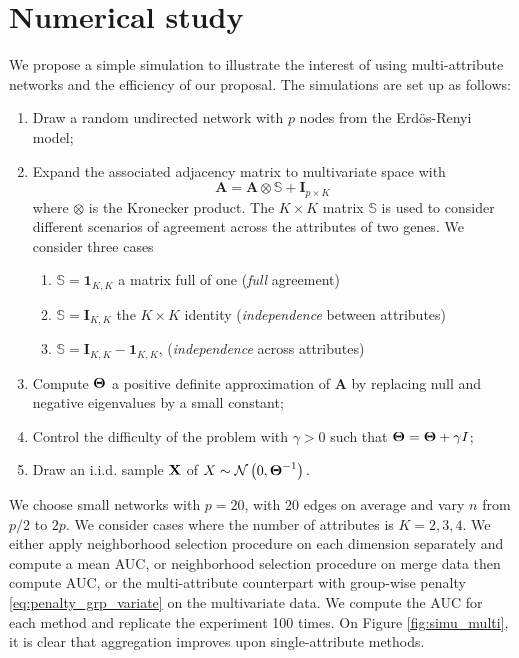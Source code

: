 \section{Numerical  study}

We propose a simple simulation to illustrate the interest of using
multi-attribute networks and the efficiency of our proposal.  The
simulations are set up as follows:
\begin{enumerate}
\item  Draw  a random  undirected  network  with  $p$ nodes  from  the
  Erdös-Renyi model;
\item  Expand the  associated adjacency  matrix to  multivariate space
  with
  $$\mathbf{A} = \mathbf{A}  \otimes \mathbb{S} + \mathbf{I}_{p\times K}$$
  where $\otimes$ is the Kronecker product. The $K\times K$ matrix
  $\mathbb{S}$ is used to consider different scenarios of agreement
  across the attributes of two genes. We consider three cases
  \begin{enumerate}
  \item $\mathbb{S} = \mathbf{1}_{K,K}$ a matrix full of one (\emph{full} agreement)
  \item $\mathbb{S} = \mathbf{I}_{K,K}$ the $K\times K$ identity (\emph{independence} between  attributes)
  \item $\mathbb{S} = \mathbf{I}_{K,K} - \mathbf{1}_{K,K}$, (\emph{independence} across attributes)
  \end{enumerate}
\item Compute $\boldsymbol\Theta$ a positive definite approximation of
  $\mathbf{A}$ by replacing null and negative eigenvalues by a small constant;
\item Control the difficulty of  the problem with $\gamma>0$ such that
  $\boldsymbol\Theta= \boldsymbol\Theta+ \gamma I$;
\item  Draw  an i.i.d.   sample  $\mathbf{X}$  of $X  \sim  \mathcal{N} \left( 0,\boldsymbol\Theta^{-1} \right) .$
\end{enumerate}
We choose small networks with $p=20$, with $20$ edges on average and
vary $n$ from $p/2$ to $2p$. We consider cases where the number of
attributes is $K=2,3,4$.  We either apply neighborhood selection
procedure on each dimension separately and compute a mean AUC, or
neighborhood selection procedure on merge data then compute AUC, or
the multi-attribute counterpart with group-wise penalty
\eqref{eq:penalty_grp_variate} on the multivariate data.  We compute
the AUC for each method and replicate the experiment 100 times. On
Figure \ref{fig:simu_multi}, it is clear that aggregation improves
upon single-attribute methods.

